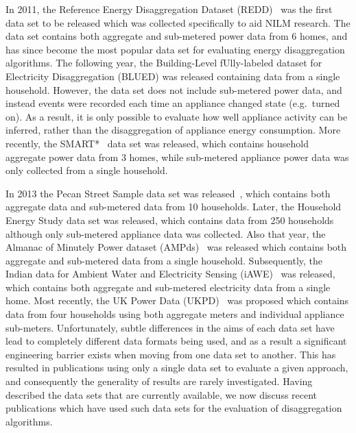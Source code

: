\documentclass{sig-alternate}
\begin{document}
In 2011, the Reference Energy Disaggregation Dataset (REDD)~\cite{redd} was the first data set to be released which was collected specifically to aid NILM research. The data set contains both aggregate and sub-metered power data from 6 homes, and has since become the most popular data set for evaluating energy disaggregation algorithms. The following year, the Building-Level fUlly-labeled dataset for Electricity Disaggregation (BLUED) was released containing data from a single household. However, the data set does not include sub-metered power data, and instead events were recorded each time an appliance changed state (e.g.\ turned on). As a result, it is only possible to evaluate how well appliance activity can be inferred, rather than the disaggregation of appliance energy consumption. More recently, the SMART*~\cite{smart} data set was released, which contains household aggregate power data from 3 homes, while sub-metered appliance power data was only collected from a single household.

In 2013 the Pecan Street Sample data set was released~\cite{pecan}, which contains both aggregate data and sub-metered data from 10 households. Later, the Household Energy Study data set was released, which contains data from 250 households although only sub-metered appliance data was collected. Also that year, the Almanac of Minutely Power dataset (AMPds)~\cite{ampds} was released which contains both aggregate and sub-metered data from a single household. Subsequently, the Indian data for Ambient Water and Electricity Sensing (iAWE)~\cite{iawe} was released, which contains both aggregate and sub-metered electricity data from a single home. Most recently, the UK Power Data (UKPD)~\cite{?} was proposed which contains data from four households using both aggregate meters and individual appliance sub-meters. Unfortunately, subtle differences in the aims of each data set have lead to completely different data formats being used, and as a result a significant engineering barrier exists when moving from one data set to another. This has resulted in publications using only a single data set to evaluate a given approach, and consequently the generality of results are rarely investigated. Having described the data sets that are currently available, we now discuss recent publications which have used such data sets for the evaluation of disaggregation algorithms.
\end{document}
